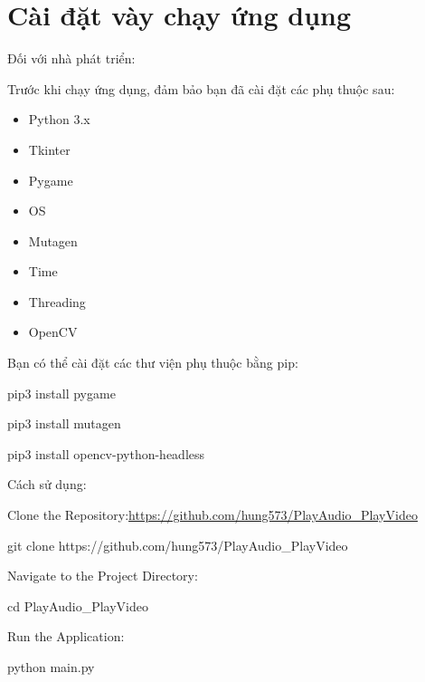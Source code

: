 \documentclass[a4paper]{article}
\begin{document}
\section{Cài đặt vày chạy ứng dụng}
\hspace*{0.5cm} Đối với nhà phát triển:

\hspace*{0.5cm}Trước khi chạy ứng dụng, đảm bảo bạn đã cài đặt các phụ thuộc sau:
\begin{itemize}
    \item Python 3.x
    \item Tkinter
    \item Pygame
    \item OS
    \item Mutagen
    \item Time
    \item Threading
    \item OpenCV
\end{itemize}

Bạn có thể cài đặt các thư viện phụ thuộc bằng pip:

\hspace*{0.5cm} pip3 install pygame

\hspace*{0.5cm} pip3 install mutagen

\hspace*{0.5cm} pip3 install opencv-python-headless


Cách sử dụng:

\hspace*{0.5cm} Clone the Repository:\href{https://github.com/hung573/PlayAudio_PlayVideo} {https://github.com/hung573/PlayAudio_PlayVideo}

\hspace*{1cm} git clone https://github.com/hung573/PlayAudio\_PlayVideo

\hspace*{0.5cm} Navigate to the Project Directory:

\hspace*{1cm} cd PlayAudio\_PlayVideo

\hspace*{0.5cm} Run the Application: 

\hspace*{1cm} python main.py
\end{document}
